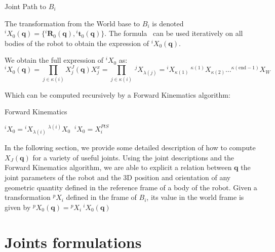 \begin{algorithm}
  \caption{Joint Path to $B_i$}
\label{alg:JP}
\begin{algorithmic}
  \EndWhile{}
\end{algorithmic}
\end{algorithm}

The transformation from the World base to $B_i$ is denoted \\ ${}^i X_0 (\mathbf{q}) = \{{}^i \mathbf{R}_0 (\mathbf{q}), {}^i \mathbf{t}_0 (\mathbf{q})\}$.
The formula~ can be used iteratively on all bodies of the robot to obtain the expression of ${}^i X_0 (\mathbf{q})$.

We obtain the full expression of ${}^i X_0$ as:
\begin{equation}
  {}^i X_0 (\mathbf{q}) = \prod_{j\in\kappa (i)}X^J_j (\mathbf{q}) X^x_j = \prod_{j\in\kappa (i)}\ {}^j X_{\lambda (j)}
  = {}^i X_{\kappa (1)}\ ^{\kappa (1)}X_{\kappa (2)} \dots ^{\kappa (\text{end}-1)}X_{W}
\end{equation}

Which can be computed recursively by a Forward Kinematics algorithm:

\begin{algorithm}
  \caption{Forward Kinematics}
\label{alg:FK}
\begin{algorithmic}
   ${}^i X_0 = {}^i X_{\lambda (i)}\ ^{\lambda (i)}X_0$
  \Else$\ {}^i X_0 = X^{PtS}_i$
  \EndIf{}
  \EndFor{}
\end{algorithmic}
\end{algorithm}

In the following section, we provide some detailed description of how to compute $X_J (\mathbf{q})$ for a variety of useful joints.
Using the joint descriptions and the Forward Kinematics algorithm, we are able to explicit a relation between $\mathbf{q}$ the joint parameters of the robot and the 3D position and orientation of  any geometric quantity defined in the reference frame of a body of the robot.
Given a transformation ${}^p X_i$ defined in the frame of $B_i$, its value in the world frame is given by ${}^p X_0 (\mathbf{q}) = {}^p X_i\ {}^i X_0 (\mathbf{q})$



\section{Joints formulations}
\label{sec:joints_formulations}

